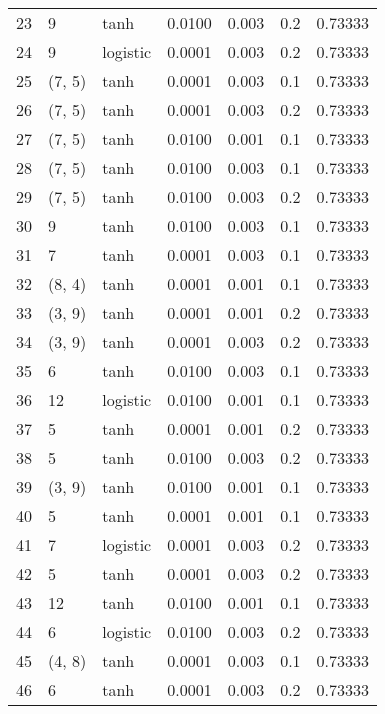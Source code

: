 \begin{tabular}{lllrrrr}
23  &           9 &      tanh &  0.0100 &  0.003 &  0.2 &   0.73333 \\
24  &           9 &  logistic &  0.0001 &  0.003 &  0.2 &   0.73333 \\
25  &      (7, 5) &      tanh &  0.0001 &  0.003 &  0.1 &   0.73333 \\
26  &      (7, 5) &      tanh &  0.0001 &  0.003 &  0.2 &   0.73333 \\
27  &      (7, 5) &      tanh &  0.0100 &  0.001 &  0.1 &   0.73333 \\
28  &      (7, 5) &      tanh &  0.0100 &  0.003 &  0.1 &   0.73333 \\
29  &      (7, 5) &      tanh &  0.0100 &  0.003 &  0.2 &   0.73333 \\
30  &           9 &      tanh &  0.0100 &  0.003 &  0.1 &   0.73333 \\
31  &           7 &      tanh &  0.0001 &  0.003 &  0.1 &   0.73333 \\
32  &      (8, 4) &      tanh &  0.0001 &  0.001 &  0.1 &   0.73333 \\
33  &      (3, 9) &      tanh &  0.0001 &  0.001 &  0.2 &   0.73333 \\
34  &      (3, 9) &      tanh &  0.0001 &  0.003 &  0.2 &   0.73333 \\
35  &           6 &      tanh &  0.0100 &  0.003 &  0.1 &   0.73333 \\
36  &          12 &  logistic &  0.0100 &  0.001 &  0.1 &   0.73333 \\
37  &           5 &      tanh &  0.0001 &  0.001 &  0.2 &   0.73333 \\
38  &           5 &      tanh &  0.0100 &  0.003 &  0.2 &   0.73333 \\
39  &      (3, 9) &      tanh &  0.0100 &  0.001 &  0.1 &   0.73333 \\
40  &           5 &      tanh &  0.0001 &  0.001 &  0.1 &   0.73333 \\
41  &           7 &  logistic &  0.0001 &  0.003 &  0.2 &   0.73333 \\
42  &           5 &      tanh &  0.0001 &  0.003 &  0.2 &   0.73333 \\
43  &          12 &      tanh &  0.0100 &  0.001 &  0.1 &   0.73333 \\
44  &           6 &  logistic &  0.0100 &  0.003 &  0.2 &   0.73333 \\
45  &      (4, 8) &      tanh &  0.0001 &  0.003 &  0.1 &   0.73333 \\
46  &           6 &      tanh &  0.0001 &  0.003 &  0.2 &   0.73333 \\

\end{tabular}
